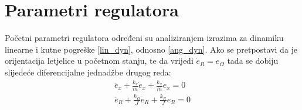 \documentclass[times, utf8, diplomski]{fer}
\begin{document}
	\newpage
	\clearpage
	
	\section{Parametri regulatora}
	Početni parametri regulatora određeni su analiziranjem izrazima za dinamiku linearne i kutne pogreške \ref{lin_dyn}, odnosno  \ref{ang_dyn}. Ako se pretpostavi da je orijentacija letjelice u početnom stanju, te da vrijedi $\dot{e}_R=e_\Omega$ tada se dobiju slijedeće diferencijalne jednadžbe drugog reda:
	\begin{gather}
		\ddot{e}_x + \frac{k_v}{m}\dot{e}_x + \frac{k_x}{m}e_x = 0 \\
		\ddot{e}_R + \frac{k_\Omega}{J}\dot{e}_R + \frac{k_R}{J}e_R = 0
	\end{gather}
	
\end{document}
